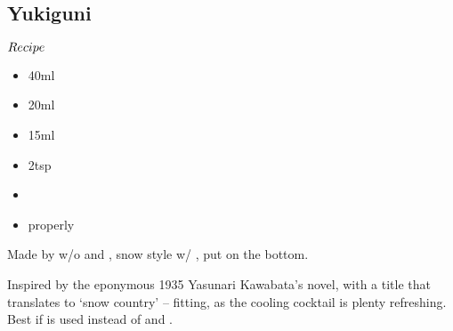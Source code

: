 \subsection{Yukiguni}
\begin{itembox}[l]{\boldmath $Recipe$}
\begin{itemize}
\setlength{\parskip}{0cm}
\setlength{\itemsep}{0cm}
\item \vodka 40ml
\item \wc 20ml
\item \limj 15ml
\item \gumsyrup 2tsp
\item \mintcherry
\item \sugar properly
\end{itemize}
\vspace{-4mm}
Made by \shake w/o \mintcherry and \sugar
\hspace{-1mm}, snow style w/ \sugar
\hspace{-1mm}, put \mintcherry on the bottom.
\end{itembox}
Inspired by the eponymous 1935 Yasunari Kawabata's novel, with a title that translates to `snow country' – fitting, as the cooling cocktail is plenty refreshing.
Best if \clime is used instead of \limj and \gumsyrup
\hspace{-1mm}.
